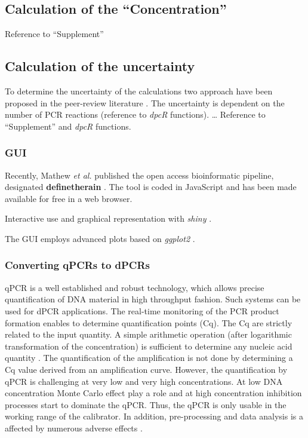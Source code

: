 \documentclass[a4,center,fleqn]{NAR}
\begin{document}
\subsection{Calculation of the ``Concentration''}
Reference to ``Supplement''

\subsection{Calculation of the uncertainty}

To determine the uncertainty of the calculations two approach have been proposed 
in the peer-review literature \cite{dube_mathematical_2008, bhat_single_2009}. 
The uncertainty is dependent on the number of PCR reactions (reference to 
\textit{\textit{dpcR}} functions). … Reference to ``Supplement'' and 
\textit{dpcR} functions.

\subsubsection{GUI}

Recently, Mathew \textit{et al.} published the open access bioinformatic 
pipeline, designated \textbf{definetherain} \cite{jones_low_2014}. The tool is 
coded in JavaScript and has been made available for free in a web browser.

Interactive use and graphical representation with \textit{shiny} \cite{shiny}.

The GUI employs advanced plots based on \textit{ggplot2} \cite{kahle_wickham_2013}.

\subsubsection{Converting qPCRs to dPCRs}

qPCR is a well established and robust technology, which allows precise 
quantification of DNA material in high throughput fashion. Such systems can be 
used for dPCR applications. The real-time monitoring of the PCR product 
formation enables to determine quantification points (Cq). The Cq are strictly 
related to the input quantity. A simple arithmetic operation (after logarithmic 
transformation of the concentration) is sufficient to determine any nucleic acid 
quantity \cite{huggett_considerations_2014}. The quantification of the 
amplification is not done by determining a Cq value derived from an 
amplification curve. However, the quantification by qPCR is challenging at very 
low and very high concentrations. At low DNA concentration Monte Carlo effect 
play a role and at high concentration inhibition processes start to dominate the 
qPCR. Thus, the qPCR is only usable in the working range of the calibrator. In 
addition, pre-processing and data analysis is a affected by numerous adverse 
effects \cite{ruijter_2013, pabinger_survey_2014, spiess_impact_2015}.
\end{document}
